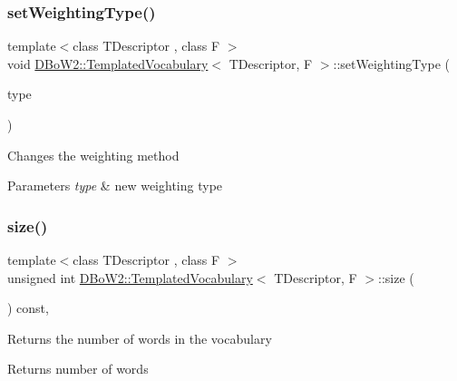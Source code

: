 \subsubsection{\texorpdfstring{set\+Weighting\+Type()}{setWeightingType()}}
{\footnotesize\ttfamily template$<$class T\+Descriptor , class F $>$ \\
void \mbox{\hyperlink{class_d_bo_w2_1_1_templated_vocabulary}{D\+Bo\+W2\+::\+Templated\+Vocabulary}}$<$ T\+Descriptor, F $>$\+::set\+Weighting\+Type (\begin{DoxyParamCaption}\item[{\mbox{\hyperlink{namespace_d_bo_w2_a5de5c8a307aca9a84ffefda2a9bc467a}{Weighting\+Type}}}]{type }\end{DoxyParamCaption})\hspace{0.3cm}{\ttfamily [inline]}}

Changes the weighting method 
\begin{DoxyParams}{Parameters}
{\em type} & new weighting type \\
\hline
\end{DoxyParams}
\mbox{\label{class_d_bo_w2_1_1_templated_vocabulary_a8baad280d6daf74ee43d7cd911363137}} 
\subsubsection{\texorpdfstring{size()}{size()}}
{\footnotesize\ttfamily template$<$class T\+Descriptor , class F $>$ \\
unsigned int \mbox{\hyperlink{class_d_bo_w2_1_1_templated_vocabulary}{D\+Bo\+W2\+::\+Templated\+Vocabulary}}$<$ T\+Descriptor, F $>$\+::size (\begin{DoxyParamCaption}{ }\end{DoxyParamCaption}) const\hspace{0.3cm}{\ttfamily [inline]}, {\ttfamily [virtual]}}

Returns the number of words in the vocabulary \begin{DoxyReturn}{Returns}
number of words 
\end{DoxyReturn}
\mbox{\label{class_d_bo_w2_1_1_templated_vocabulary_a0b6721fde54bd8cd008f6a120398741e}} 
